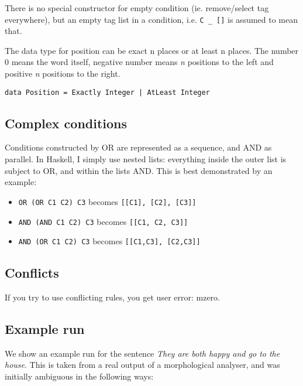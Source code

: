 \documentclass[a4paper, 11pt]{article}
\begin{document}
There is no special constructor for empty condition (ie. remove/select tag everywhere), but an empty tag list in a condition, i.e. \texttt{C \_ []} is assumed to mean that.

The data type for position can be exact n places or at least n places. The number 0 means the word itself, negative number means \emph{n} positions to the left and positive \emph{n} positions to the right.

\begin{lstlisting}
data Position = Exactly Integer | AtLeast Integer
 \end{lstlisting}

\subsection{Complex conditions}
Conditions constructed by OR are represented as a sequence, and AND as
parallel. In Haskell, I simply use nested lists: everything inside the
outer list is subject to OR, and within the lists AND. This is best
demonstrated by an example:

\begin{itemize}
\item \texttt{OR (OR C1 C2) C3} becomes \texttt{[[C1], [C2], [C3]]} 
\item \texttt{AND (AND C1 C2) C3} becomes \texttt{[[C1, C2, C3]]} 
\item \texttt{AND (OR C1 C2) C3} becomes \texttt{[[C1,C3], [C2,C3]]}
\end{itemize}

\subsection{Conflicts}
If you try to use conflicting rules, you get user error: mzero.

\subsection{Example run}

We show an example run for the sentence \emph{They are both happy and go to the house}. This is
taken from a real output of a morphological analyser, and was
initially ambiguous in the following ways:
\end{document}
